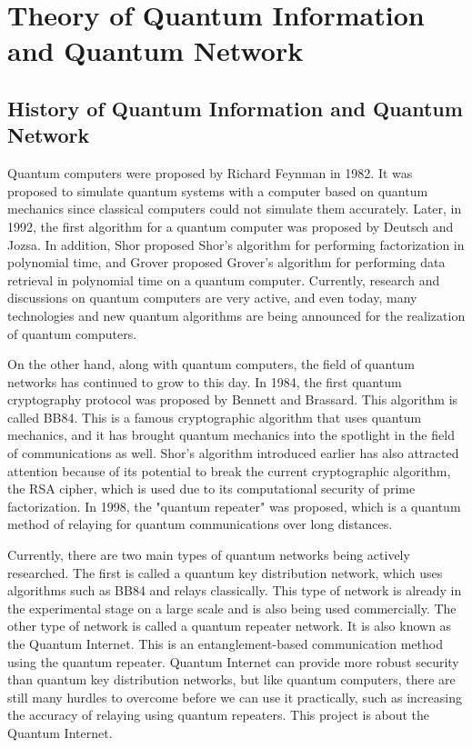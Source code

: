\chapter{Theory of Quantum Information and Quantum Network}
\label{theory_of_quantum_information}
\section{History of Quantum Information and Quantum Network}
Quantum computers were proposed by Richard Feynman in 1982\cite{feynman1982simulating}.
It was proposed to simulate quantum systems with a computer based on quantum mechanics since classical computers could not simulate them accurately.
Later, in 1992, the first algorithm for a quantum computer was proposed by Deutsch and Jozsa\cite{deutsch1992rapid}.
In addition, Shor proposed Shor's algorithm for performing factorization in polynomial time\cite{shor1997}, and Grover proposed Grover's algorithm for performing data retrieval in polynomial time\cite{grover1996fast} on a quantum computer.
Currently, research and discussions on quantum computers are very active, and even today, many technologies and new quantum algorithms are being announced for the realization of quantum computers.

On the other hand, along with quantum computers, the field of quantum networks has continued to grow to this day.
In 1984, the first quantum cryptography protocol was proposed by Bennett and Brassard\cite{BEN84}.
This algorithm is called BB84.
This is a famous cryptographic algorithm that uses quantum mechanics, and it has brought quantum mechanics into the spotlight in the field of communications as well.
Shor's algorithm introduced earlier has also attracted attention because of its potential to break the current cryptographic algorithm, the RSA cipher, which is used due to its computational security of prime factorization.
In 1998, the "quantum repeater" was proposed, which is a quantum method of relaying for quantum communications over long distances\cite{briegel1998quantum}\cite{dur1999quantum}.

Currently, there are two main types of quantum networks being actively researched.
The first is called a quantum key distribution network, which uses algorithms such as BB84 and relays classically. 
This type of network is already in the experimental stage on a large scale and is also being used commercially\cite{bennett1992dawn}\cite{elliott2005current}\cite{sasaki2011field}.
The other type of network is called a quantum repeater network.
It is also known as the Quantum Internet.
This is an entanglement-based communication method using the quantum repeater.
Quantum Internet can provide more robust security than quantum key distribution networks, but like quantum computers, there are still many hurdles to overcome before we can use it practically, such as increasing the accuracy of relaying using quantum repeaters.
This project is about the Quantum Internet.

